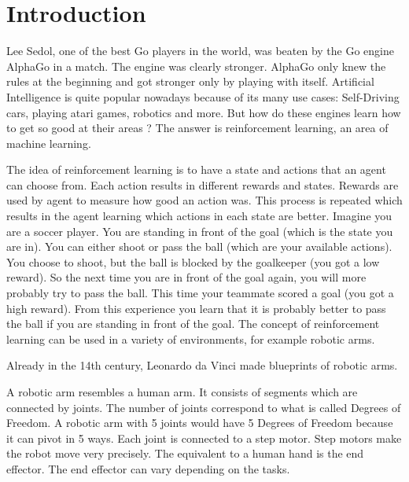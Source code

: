 \chapter{Introduction}



Lee Sedol, one of the best Go players in the world, was beaten by the Go engine AlphaGo in a match. The engine was clearly stronger.  
AlphaGo only knew the rules at the beginning and got stronger only by playing with itself. 
Artificial Intelligence is quite popular nowadays because of its many use cases: Self-Driving cars, playing atari games, robotics and more. 
But how do these engines learn how to get so good at their areas ? The answer is reinforcement learning, an area of machine learning. 

\vspace{0.5cm}

The idea of reinforcement learning is to have a state and actions that an agent can choose from. Each action results in different rewards and states. Rewards are used by agent to measure how good an action was. This process is repeated which results in the agent learning which actions in each state are better.
Imagine you are a soccer player. You are standing in front of the goal (which is the state you are in). You can either shoot or pass the ball (which are your available actions). You choose to shoot, but the ball is blocked by the goalkeeper (you got a low reward). So the next time you are in front of the goal again, you will more probably try to pass the ball. This time your teammate scored a goal (you got a high reward). From this experience you learn that it is probably better to pass the ball if you are standing in front of the goal.
The concept of reinforcement learning can be used in a variety of environments, for example robotic arms.

\vspace{0.5cm}


Already in the 14th century, Leonardo da Vinci made blueprints of robotic arms.

A robotic arm resembles a human arm. It consists of segments which are connected by joints. 
The number of joints correspond to what is called Degrees of Freedom. A robotic arm with 5 joints would have 5 Degrees of Freedom because it can pivot in 5 ways. Each joint is connected to a step motor. Step motors make the robot move very precisely.
The equivalent to a human hand is the end effector. The end effector can vary depending on the tasks.  

